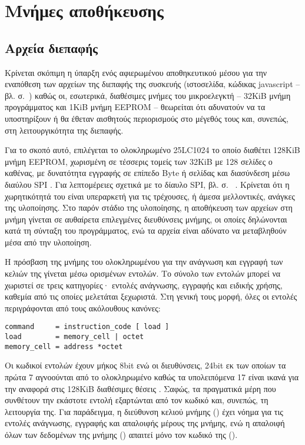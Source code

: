 \section{Μνήμες αποθήκευσης}


\subsection{Αρχεία διεπαφής}

Κρίνεται σκόπιμη η ύπαρξη ενός αφιερωμένου αποθηκευτικού μέσου για την εναπόθεση
των αρχείων της διεπαφής της συσκευής (ιστοσελίδα, κώδικας javascript  --
βλ.  σ.~\pageref{subsec:network:files}) καθώς οι,
εσωτερικά, διαθέσιμες μνήμες του μικροελεγκτή -- 32KiB μνήμη προγράμματος και
1KiB μνήμη EEPROM -- θεωρείται ότι αδυνατούν να τα υποστηρίξουν ή θα έθεταν
αισθητούς περιορισμούς στο μέγεθός τους και, συνεπώς, στη λειτουργικότητα της
διεπαφής.

Για το σκοπό αυτό, επιλέγεται το ολοκληρωμένο 25LC1024 το οποίο διαθέτει 128KiB
μνήμη EEPROM, χωρισμένη σε τέσσερις τομείς των 32KiB με 128 σελίδες ο καθένας,
με δυνατότητα εγγραφής σε επίπεδο Byte ή σελίδας και διασύνδεση μέσω διαύλου SPI
\parencite[1]{25lc1024}. Για λεπτομέρειες σχετικά με το δίαυλο SPI, βλ. σ.~%
\pageref{subsec:spi}. Κρίνεται ότι η χωρητικότητά του είναι υπεραρκετή για τις
τρέχουσες, ή άμεσα μελλοντικές, ανάγκες της υλοποίησης.
Στο παρόν στάδιο της υλοποίησης, η αποθήκευση των αρχείων στη μνήμη γίνεται σε
αυθαίρετα επιλεγμένες διευθύνσεις μνήμης, οι οποίες δηλώνονται κατά τη σύνταξη
του προγράμματος, ενώ τα αρχεία είναι αδύνατο να μεταβληθούν μέσα από την
υλοποίηση.

Η πρόσβαση της μνήμης του ολοκληρωμένου για την ανάγνωση και εγγραφή των κελιών
της γίνεται μέσω ορισμένων εντολών. Το σύνολο των εντολών μπορεί να χωριστεί σε
τρεις κατηγορίες· εντολές ανάγνωσης, εγγραφής και ειδικής χρήσης, καθεμία από
τις οποίες μελετάται ξεχωριστά. Στη γενική τους μορφή, όλες οι εντολές
περιγράφονται από τους ακόλουθους κανόνες:
\begin{lstlisting}
command     = instruction_code [ load ]
load        = memory_cell | octet
memory_cell = address *octet
\end{lstlisting}
Οι κωδικοί εντολών έχουν μήκος 8bit ενώ οι διευθύνσεις, 24bit εκ των οποίων τα
πρώτα 7 αγνοούνται από το ολοκληρωμένο καθώς τα υπολειπόμενα 17 είναι ικανά για
την αναφορά στις 128KiB διαθέσιμες θέσεις \parencite[6--7]{25lc1024}. Σαφώς,
τα πραγματικά μέρη που συνθέτουν την εκάστοτε εντολή εξαρτώνται από τον κωδικό
και, συνεπώς, τη λειτουργία της. Για παράδειγμα, η διεύθυνση κελιού μνήμης
() έχει νόημα για τις εντολές ανάγνωσης, εγγραφής και
απαλοιφής μέρους της μνήμης, ενώ η απαλοιφή όλων των δεδομένων της μνήμης
() απαιτεί μόνο τον κωδικό της ().

